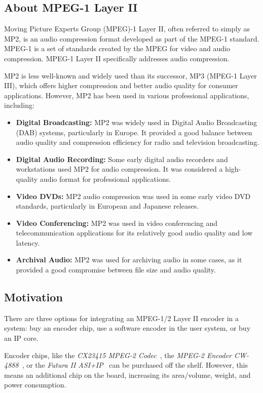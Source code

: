 \subsection{About MPEG-1 Layer II}

Moving Picture Experts Group (MPEG)-1 Layer II, often referred to simply as MP2, is an audio compression format developed as part of the MPEG-1 standard. MPEG-1 is a set of standards created by the MPEG for video and audio compression. MPEG-1 Layer II specifically addresses audio compression.

MP2 is less well-known and widely used than its successor, MP3 (MPEG-1 Layer III), which offers higher compression and better audio quality for consumer applications. However, MP2 has been used in various professional applications, including:

\begin{itemize}
    \item \textbf{Digital Broadcasting:} MP2 was widely used in Digital Audio Broadcasting (DAB) systems, particularly in Europe. It provided a good balance between audio quality and compression efficiency for radio and television broadcasting.
    \item \textbf{Digital Audio Recording:} Some early digital audio recorders and workstations used MP2 for audio compression. It was considered a high-quality audio format for professional applications.
    \item \textbf{Video DVDs:} MP2 audio compression was used in some early video DVD standards, particularly in European and Japanese releases.
    \item \textbf{Video Conferencing:} MP2 was used in video conferencing and telecommunication applications for its relatively good audio quality and low latency.
    \item \textbf{Archival Audio:} MP2 was used for archiving audio in some cases, as it provided a good compromise between file size and audio quality.
\end{itemize}



\subsection{Motivation}

There are three options for integrating an MPEG-1/2 Layer II encoder in a system: buy an encoder chip, use a software encoder in the user system, or buy an IP core.

Encoder chips, like the \textit{CX23415 MPEG-2 Codec}~\cite{cx23415}, the \textit{MPEG-2 Encoder CW-4888}~\cite{cw4888}, or the \textit{Futura II ASI+IP}~\cite{futura} can be purchased off the shelf. However, this means an additional chip on the board, increasing its area/volume, weight, and power consumption.

